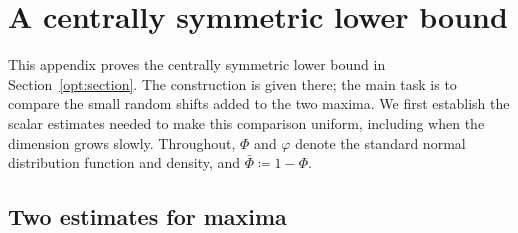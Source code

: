\documentclass[11pt,letterpaper]{article}
\theoremstyle{remark}
\begin{document}
\section{A centrally symmetric lower bound}
\label{app:symmetric-lower}

This appendix proves the centrally symmetric lower bound in
Section~\ref{opt:section}. The construction is given there; the main
task is to compare the small random shifts added to the two maxima.
We first establish the scalar estimates needed to make this comparison
uniform, including when the dimension grows slowly. Throughout,
\(\Phi\) and \(\varphi\) denote the standard normal distribution
function and density, and \(\bar\Phi\coloneqq1-\Phi\).

\subsection{Two estimates for maxima}
\end{document}
